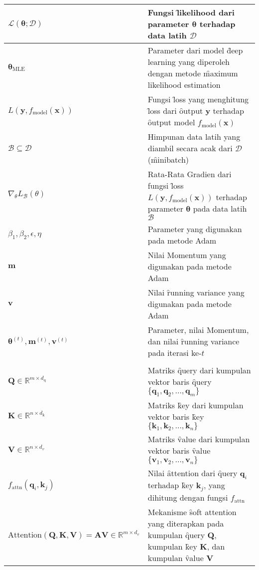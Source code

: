 \begin{longtable*}{| P{0.3\textwidth} |  P{0.7\textwidth} |}
    $\mathcal{L}(\bm{\theta}; \mathcal{D})$ & Fungsi \f{likelihood} dari parameter $\bm{\theta}$ terhadap data latih $\mathcal{D}$ \\ \hline
    $\bm{\theta}_{\text{MLE}}$ & Parameter dari model \f{deep learning} yang diperoleh dengan metode \f{maximum likelihood estimation} \\ \hline
    $L(\mathbf{y}, f_\text{model}(\mathbf{x}))$ & Fungsi \f{loss} yang menghitung \f{loss} dari \f{output} $\mathbf{y}$ terhadap \f{output} model $f_\text{model}(\mathbf{x})$ \\ \hline
    $\mathcal{B} \subseteq \mathcal{D}$ & Himpunan data latih yang diambil secara acak dari $\mathcal{D}$ (\f{minibatch}) \\ \hline
    $ \nabla_{\theta} L_{\mathcal{B}}(\theta)$ & Rata-Rata Gradien dari fungsi \f{loss} $L(\mathbf{y}, f_\text{model}(\mathbf{x}))$ terhadap parameter $\bm{\theta}$ pada data latih $\mathcal{B}$ \\ \hline
    $\beta_1, \beta_2, \epsilon, \eta$ & Parameter yang digunakan pada metode Adam \\ \hline
    $\mathbf{m}$ & Nilai Momentum yang digunakan pada metode Adam \\ \hline
    $\mathbf{v}$ & Nilai \f{running variance} yang digunakan pada metode Adam \\ \hline
    $\bm{\theta}^{(t)}, \mathbf{m}^{(t)}, \mathbf{v}^{(t)}$ & Parameter, nilai Momentum, dan nilai \f{running variance} pada iterasi ke-$t$ \\ \hline
     \\ \hline
    $\mathbf{Q} \in \mathbb{R}^{m \times d_{\text{q}}}$ & Matriks \f{query} dari kumpulan vektor baris \f{query} $\{ \mathbf{q}_1, \mathbf{q}_2, \dots, \mathbf{q}_m \}$ \\ \hline
    $\mathbf{K} \in \mathbb{R}^{n \times d_{\text{k}}}$ & Matriks \f{key} dari kumpulan vektor baris \f{key} $\{ \mathbf{k}_1, \mathbf{k}_2, \dots, \mathbf{k}_n \}$ \\ \hline
    $\mathbf{V} \in \mathbb{R}^{n \times d_{v}}$ & Matriks \f{value} dari kumpulan vektor baris \f{value} $\{ \mathbf{v}_1, \mathbf{v}_2, \dots, \mathbf{v}_n \}$ \\ \hline
    $f_{\text{attn}}(\mathbf{q}_i, \mathbf{k}_j)$ & Nilai \f{attention} dari \f{query} $\mathbf{q}_i$ terhadap \f{key} $\mathbf{k}_j$, yang dihitung dengan fungsi $f_{\text{attn}}$ \\ \hline
    $\text{Attention}(\mathbf{Q}, \mathbf{K}, \mathbf{V}) = \mathbf{AV} \in \mathbb{R}^{m \times d_{v}}$ &  Mekanisme \f{soft attention} yang diterapkan pada kumpulan \f{query} $\mathbf{Q}$, kumpulan \f{key} $\mathbf{K}$, dan kumpulan \f{value} $\mathbf{V}$ \\ \hline

\end{longtable*}
